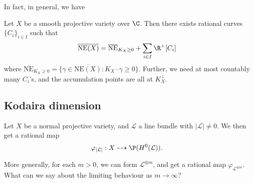 \documentclass[a4paper]{article}
\newcommand\NE{\mathrm{NE}}
\DeclareMathOperator\Proj{Proj}
\begin{document}
In fact, in general, we have
\begin{thm}
  Let $X$ be a smooth projective variety over $\C$. Then there exists rational curves $\{C_i\}_{i \in I}$ such that
  \[
    \overline{\NE(X)} = \overline{\NE}_{K_X \geq 0} + \sum_{i \in I} \R^+ [C_i]
  \]
  where $\overline{\NE}_{K_X \geq 0} = \{\gamma \in \overline{\NE(X)} : K_X \cdot \gamma \geq 0\}$. Further, we need at most countably many $C_i$'s, and the accumulation points are all at $K_X^\perp$.
\end{thm}


\subsection{Kodaira dimension}
Let $X$ be a normal projective variety, and $\mathcal{L}$ a line bundle with $|\mathcal{L}| \not= 0$. We then get a rational map
\[
  \varphi_{|\mathcal{L}|}: X \dashrightarrow \P(H^0(\mathcal{L})).
\]

More generally, for each $m > 0$, we can form $\mathcal{L}^{\otimes m}$, and get a rational map $\varphi_{\mathcal{L}^{\otimes m}}$. What can we say about the limiting behaviour as $m \to \infty$?
%
\end{document}
